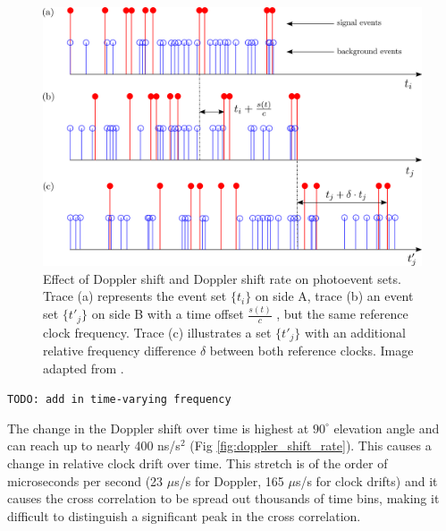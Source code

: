 \begin{figure}[ht!]
	\centering
	\includegraphics[width=0.95\linewidth]{assets/correlation_smear.png}
	\caption{Effect of Doppler shift and Doppler shift rate on photoevent sets. Trace (a) represents the event set $\{t_i\}$ on side  A, trace (b) an event  set $\{t′_j\}$ on side B  with a time offset $\frac{s(t)}{c}$ , but  the  same reference clock frequency. Trace (c) illustrates a set $\{t'_j\}$ with an additional relative frequency difference $\delta$ between both reference clocks. Image adapted from \cite{ho2009clock}.}
	\label{fig:correlation_smear}
\end{figure}

\texttt{TODO: add in time-varying frequency}

The change in the Doppler shift over time is highest at $90^\circ$ elevation angle and can reach up to nearly 400 ns/s$^2$ (Fig \ref{fig:doppler_shift_rate}). This causes a change in relative clock drift over time. This stretch is of the order of microseconds per second (23 $\mu$s/s for Doppler, 165 $\mu$s/s for clock drifts) and it causes the cross correlation to be spread out thousands of time bins, making it difficult to distinguish a significant peak in the cross correlation.

